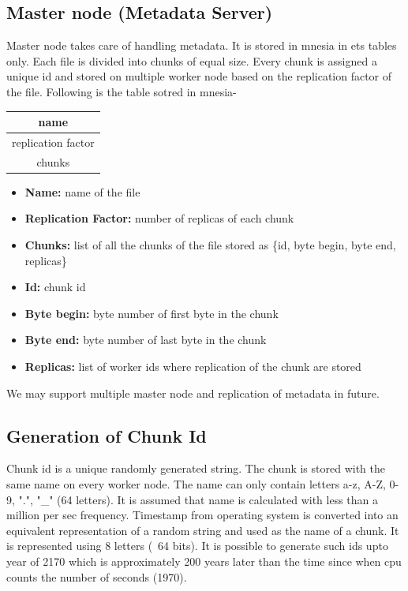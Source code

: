 \documentclass[a4paper,12pt]{article}
\begin{document}
\subsection{Master node (Metadata Server)}
Master node takes care of handling metadata. It is stored in mnesia in ets tables only. Each file is divided into chunks of equal size. Every chunk is assigned a unique id and stored on multiple worker node based on the replication factor of the file. Following is the table sotred in mnesia-
\begin{table}[h]
\centering
\begin{tabular}{|c|}
\hline 
name \\ 
\hline 
replication factor \\ 
\hline 
chunks \\ 
\hline 
\end{tabular} 
\end{table}

\begin{itemize}
\item \textbf{Name:} name of the file
\item \textbf{Replication Factor:} number of replicas of each chunk
\item \textbf{Chunks:} list of all the chunks of the file stored as \{id, byte begin, byte end, replicas\}
\item \textbf{Id:} chunk id
\item \textbf{Byte begin:} byte number of first byte in the chunk
\item \textbf{Byte end:} byte number of last byte in the chunk
\item \textbf{Replicas:} list of worker ids where replication of the chunk are stored
\end{itemize}

We may support multiple master node and replication of metadata in future.

\subsection{Generation of Chunk Id}
Chunk id is a unique randomly generated string. The chunk is stored with the same name on every worker node. The name can only contain letters a-z, A-Z, 0-9, ".", "\_" (64 letters). It is assumed that name is calculated with less than a million per sec frequency.  Timestamp from operating system is converted into an equivalent representation of a random string and used as the name of a chunk. It is represented using 8 letters (~64 bits). It is possible to generate such ids upto year of 2170 which is approximately 200 years later than the time since when cpu counts the number of seconds (1970).
\end{document}
